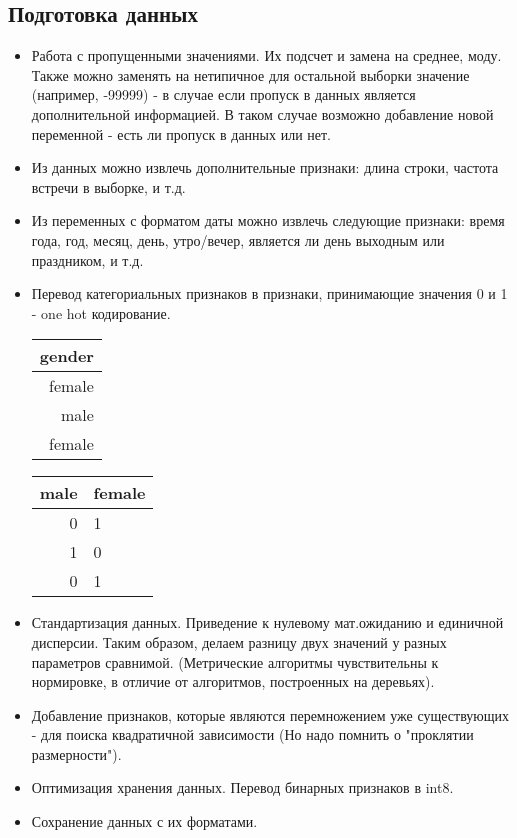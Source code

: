 \documentclass{article}
\begin{document}
\subsection{Подготовка данных}
 \begin{itemize}
     \item Работа с пропущенными значениями. Их подсчет и замена на среднее, моду. Также можно заменять на нетипичное для остальной выборки значение (например, -99999) - в случае если пропуск в данных является дополнительной информацией. В таком случае возможно добавление новой переменной - есть ли пропуск в данных или нет.
     \item Из данных можно извлечь дополнительные признаки: длина строки, частота встречи в выборке, и т.д.
     \item Из переменных с форматом даты можно извлечь следующие признаки: время года, год, месяц, день, утро/вечер, является ли день выходным или праздником, и т.д.
     
     \item Перевод категориальных признаков в признаки, принимающие значения 0 и 1 - one hot кодирование.
    \begin{center}
     \begin{tabular}{|r|}
     \hline
     gender \\
     \hline\hline
     female \\
     male \\
     female \\
     \hline
     \end{tabular}
     \quad
     \longrightarrow
      \begin{tabular}{|r|l|}
     \hline
     male & female \\
     \hline\hline
     0 & 1 \\
     1 & 0 \\
     0 & 1 \\
     \hline
     \end{tabular}
    \end{center}
     
     \item Стандартизация данных. Приведение к нулевому мат.ожиданию и единичной дисперсии. Таким образом, делаем разницу двух значений у разных параметров сравнимой. (Метрические алгоритмы чувствительны к нормировке, в отличие от алгоритмов, построенных на деревьях).
     \item Добавление признаков, которые являются перемножением уже существующих - для поиска квадратичной зависимости (Но надо помнить о "проклятии размерности").
     
     \item Оптимизация хранения данных. Перевод бинарных признаков в int8.
     
     \item Сохранение данных с их форматами.
     
 \end{itemize}
 
\end{document}
